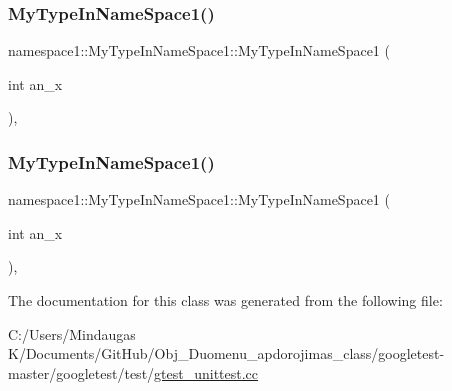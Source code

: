 \mbox{\label{classnamespace1_1_1_my_type_in_name_space1_a2e4277aa118e9b83045a18392188a0d8}} 
\subsubsection{\texorpdfstring{MyTypeInNameSpace1()}{MyTypeInNameSpace1()}\hspace{0.1cm}{\footnotesize\ttfamily [2/3]}}
{\footnotesize\ttfamily namespace1\+::\+My\+Type\+In\+Name\+Space1\+::\+My\+Type\+In\+Name\+Space1 (\begin{DoxyParamCaption}\item[{int}]{an\+\_\+x }\end{DoxyParamCaption})\hspace{0.3cm}{\ttfamily [inline]}, {\ttfamily [explicit]}}

\mbox{\label{classnamespace1_1_1_my_type_in_name_space1_a2e4277aa118e9b83045a18392188a0d8}} 
\subsubsection{\texorpdfstring{MyTypeInNameSpace1()}{MyTypeInNameSpace1()}\hspace{0.1cm}{\footnotesize\ttfamily [3/3]}}
{\footnotesize\ttfamily namespace1\+::\+My\+Type\+In\+Name\+Space1\+::\+My\+Type\+In\+Name\+Space1 (\begin{DoxyParamCaption}\item[{int}]{an\+\_\+x }\end{DoxyParamCaption})\hspace{0.3cm}{\ttfamily [inline]}, {\ttfamily [explicit]}}



The documentation for this class was generated from the following file\+:\begin{DoxyCompactItemize}
\item 
C\+:/\+Users/\+Mindaugas K/\+Documents/\+Git\+Hub/\+Obj\+\_\+\+Duomenu\+\_\+apdorojimas\+\_\+class/googletest-\/master/googletest/test/\mbox{\hyperlink{googletest-master_2googletest_2test_2gtest__unittest_8cc}{gtest\+\_\+unittest.\+cc}}\end{DoxyCompactItemize}
